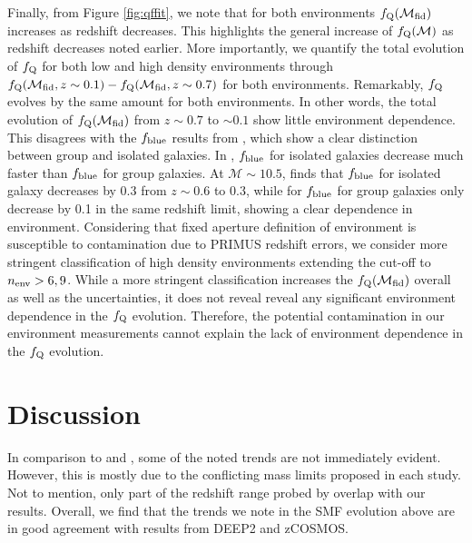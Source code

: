 \documentclass{emulateapj}
\begin{document}
Finally, from Figure \ref{fig:qffit}, we note that for both environments $f_{\rm{Q}}(\mathcal{M}_{\rm{fid}})$ increases as redshift decreases. This highlights the general increase of $f_{\rm{Q}}(\mathcal{M})$ as redshift decreases noted earlier. More importantly, we quantify the total evolution of $f_{\rm{Q}}$ for both low and high density environments through $f_{\rm{Q}}(\mathcal{M}_{\rm{fid}}, z \sim 0.1) - f_{\rm{Q}}(\mathcal{M}_{\rm{fid}}, z \sim 0.7)$ for both environments. Remarkably, $f_{\rm{Q}}$ evolves by the same amount for both environments. In other words, the total evolution of $f_{\rm{Q}}(\mathcal{M}_{\rm{fid}})$ from $z \sim 0.7$ to $\sim 0.1$ show little environment dependence. This disagrees with the $f_{\rm{blue}}$ results from \cite{Iovino:2010aa}, which show a clear distinction between group and isolated galaxies. In \cite{Iovino:2010aa}, $f_{\rm{blue}}$ for isolated galaxies decrease much faster than $f_{\rm{blue}}$ for group galaxies. At $\mathcal{M} \sim 10.5$, \cite{Iovino:2010aa} finds that $f_{\rm{blue}}$ for isolated galaxy decreases by 0.3 from $z \sim 0.6$ to 0.3, while for $f_{\rm{blue}}$ for group galaxies only decrease by 0.1 in the same redshift limit, showing a clear dependence in environment. Considering that fixed aperture definition of environment is susceptible to contamination due to PRIMUS redshift errors, we consider more stringent classification of high density environments extending the cut-off to $n_{\rm{env}} > 6, 9$. While a more stringent classification increases the $f_{\rm{Q}}(\mathcal{M}_{\rm{fid}})$ overall as well as the uncertainties, it does not reveal reveal any significant environment dependence in the $f_{\rm{Q}}$ evolution. Therefore, the potential contamination in our environment measurements cannot explain the lack of environment dependence in the $f_{\rm{Q}}$ evolution. 

\section{Discussion} \label{sec:discussion}
In comparison to \cite{bundy06a} and \cite{Bolzonella:2010aa}, some of the noted trends are not immediately evident. However, this is mostly due to the conflicting mass limits proposed in each study. Not to mention, only part of the redshift range probed by \cite{bundy06a} overlap with our results. Overall, we find that the trends we note in the SMF evolution above are in good agreement with results from DEEP2 and zCOSMOS. 
\end{document}
